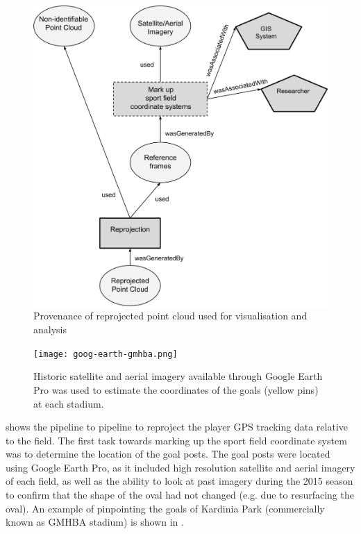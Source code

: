 \begin{figure}[H]
\centering
\includegraphics[width=0.9\linewidth]{figs/prov/prov-3.png}
\caption{Provenance of reprojected point cloud used for visualisation and analysis \notationdetails{}
\label{fig:prov3}}
\end{figure}

\begin{figure}[htbp]
\centering
\texttt{[image: goog-earth-gmhba.png]}
\caption{Historic satellite and aerial imagery available through Google Earth Pro was used to estimate the coordinates of the goals (yellow pins) at each stadium.}
\label{fig:gps-pinpoint-example}
\end{figure}

 shows the pipeline to pipeline to reproject the player GPS tracking data relative to the field. The first task towards marking up the sport field coordinate system was to determine the location of the goal posts. The goal posts were located using Google Earth Pro, as it included high resolution satellite and aerial imagery of each field, as well as the ability to look at past imagery during the 2015 season to confirm that the shape of the oval had not changed (e.g. due to resurfacing the oval). An example of pinpointing the goals of Kardinia Park (commercially known as GMHBA stadium) is shown in .

\newpage{}

